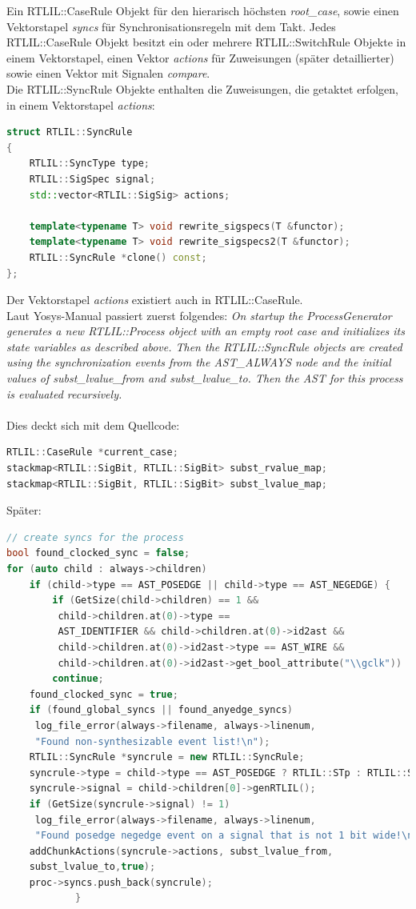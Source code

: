 \documentclass[11pt]{report}
\begin{document}
Ein RTLIL::CaseRule Objekt für den hierarisch höchsten \textit{root\_case}, sowie einen Vektorstapel \textit{syncs} für Synchronisationsregeln mit dem Takt.
Jedes RTLIL::CaseRule Objekt besitzt ein oder mehrere RTLIL::SwitchRule Objekte in einem Vektorstapel, einen Vektor \textit{actions} für Zuweisungen (später detaillierter) sowie einen Vektor mit Signalen \textit{compare}.\\
Die RTLIL::SyncRule Objekte enthalten die Zuweisungen, die getaktet erfolgen, in einem Vektorstapel \textit{actions}:
\begin{lstlisting}[language=C++]
struct RTLIL::SyncRule
{
	RTLIL::SyncType type;
	RTLIL::SigSpec signal;
	std::vector<RTLIL::SigSig> actions;

	template<typename T> void rewrite_sigspecs(T &functor);
	template<typename T> void rewrite_sigspecs2(T &functor);
	RTLIL::SyncRule *clone() const;
};
\end{lstlisting}
Der Vektorstapel \textit{actions} existiert auch in RTLIL::CaseRule.\\
Laut Yosys-Manual passiert zuerst folgendes:
\textit{
On startup the ProcessGenerator generates a new RTLIL::Process object with an empty root case and initializes its state variables as described above. Then the RTLIL::SyncRule objects are created using the synchronization events from the AST\_ALWAYS node and the initial values of subst\_lvalue\_from and subst\_lvalue\_to. Then the AST for this process is evaluated recursively.
}
\\
\\
Dies deckt sich mit dem Quellcode:
\begin{lstlisting}[language=C++]
RTLIL::CaseRule *current_case;
stackmap<RTLIL::SigBit, RTLIL::SigBit> subst_rvalue_map;
stackmap<RTLIL::SigBit, RTLIL::SigBit> subst_lvalue_map;
\end{lstlisting}
Später:
\begin{lstlisting}[language=C++]
// create syncs for the process
bool found_clocked_sync = false;
for (auto child : always->children)
	if (child->type == AST_POSEDGE || child->type == AST_NEGEDGE) {
		if (GetSize(child->children) == 1 && 
		 child->children.at(0)->type == 
		 AST_IDENTIFIER && child->children.at(0)->id2ast &&
		 child->children.at(0)->id2ast->type == AST_WIRE && 
		 child->children.at(0)->id2ast->get_bool_attribute("\\gclk"))
		continue;
	found_clocked_sync = true;
	if (found_global_syncs || found_anyedge_syncs)
	 log_file_error(always->filename, always->linenum, 
	 "Found non-synthesizable event list!\n");
	RTLIL::SyncRule *syncrule = new RTLIL::SyncRule;
	syncrule->type = child->type == AST_POSEDGE ? RTLIL::STp : RTLIL::STn;
	syncrule->signal = child->children[0]->genRTLIL();
	if (GetSize(syncrule->signal) != 1)
	 log_file_error(always->filename, always->linenum, 
	 "Found posedge negedge event on a signal that is not 1 bit wide!\n");
	addChunkActions(syncrule->actions, subst_lvalue_from, 
	subst_lvalue_to,true);
	proc->syncs.push_back(syncrule);
			}
\end{lstlisting}
\end{document}
